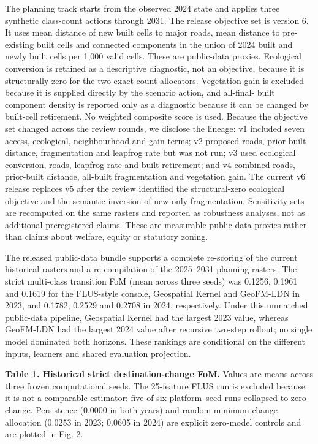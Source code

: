 The planning track starts from the observed 2024 state and applies three
synthetic class-count actions through 2031. The release objective set is
version 6. It uses mean distance of new built cells to major roads, mean
distance to pre-existing built cells and connected components in the
union of 2024 built and newly built cells per 1,000 valid cells. These
are public-data proxies. Ecological conversion is retained as a
descriptive diagnostic, not an objective, because it is structurally
zero for the two exact-count allocators. Vegetation gain is excluded
because it is supplied directly by the scenario action, and all-final-
built component density is reported only as a diagnostic because it can
be changed by built-cell retirement. No weighted composite score is
used. Because the objective set changed across the review rounds, we
disclose the lineage: v1 included seven access, ecological,
neighbourhood and gain terms; v2 proposed roads, prior-built distance,
fragmentation and leapfrog rate but was not run; v3 used ecological
conversion, roads, leapfrog rate and built retirement; and v4 combined
roads, prior-built distance, all-built fragmentation and vegetation
gain. The current v6 release replaces v5 after the review identified the
structural-zero ecological objective and the semantic inversion of
new-only fragmentation. Sensitivity sets are recomputed on the same
rasters and reported as robustness analyses, not as additional
preregistered claims. These are measurable public-data proxies rather
than claims about welfare, equity or statutory zoning.

The released public-data bundle supports a complete re-scoring of the
current historical rasters and a re-compilation of the 2025--2031
planning rasters. The strict multi-class transition FoM (mean across
three seeds) was 0.1256, 0.1961 and 0.1619 for the FLUS-style console,
Geospatial Kernel and GeoFM-LDN in 2023, and 0.1782, 0.2529 and 0.2708
in 2024, respectively. Under this unmatched public-data pipeline,
Geospatial Kernel had the largest 2023 value, whereas GeoFM-LDN had the
largest 2024 value after recursive two-step rollout; no single model
dominated both horizons. These rankings are conditional on the different
inputs, learners and shared evaluation projection.

\textbf{Table 1. Historical strict destination-change FoM.} Values are
means across three frozen computational seeds. The 25-feature FLUS run
is excluded because it is not a comparable estimator: five of six
platform--seed runs collapsed to zero change. Persistence (0.0000 in
both years) and random minimum-change allocation (0.0253 in 2023; 0.0605
in 2024) are explicit zero-model controls and are plotted in Fig. 2.

